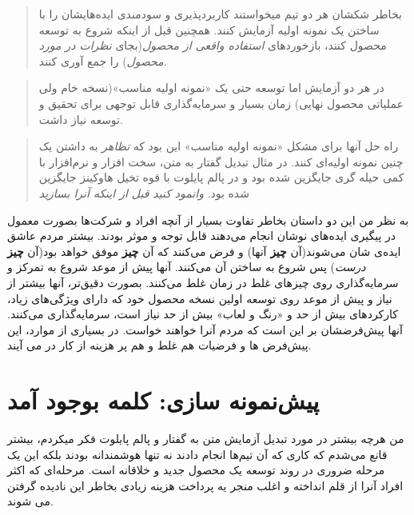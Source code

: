 \begin{quote}
بخاطر شکشان هر دو تیم میخواستند کاربردپذیری و سودمندی ایده‌هایشان را با
ساختن یک نمونه اولیه آزمایش کنند. همچنین قبل از اینکه شروع به توسعه
محصول کنند، بازخوردهای \emph{استفاده واقعی از محصول}(بجای \emph{نظرات در
مورد محصول}) را جمع آوری کنند.
\end{quote}

\begin{quote}
در هر دو آزمایش اما توسعه حتی یک «نمونه اولیه مناسب»(نسخه خام ولی
عملیاتی محصول نهایی) زمان بسیار و سرمایه‌گذاری قابل توجهی برای تحقیق و
توسعه نیاز داشت.
\end{quote}

\begin{quote}
راه حل آنها برای مشکل «نمونه اولیه مناسب» این بود که \emph{تظاهر} به
داشتن یک چنین نمونه اولیه‌ای کنند. در مثال تبدیل گفتار به متن، سخت افزار
و نرم‌افزار با کمی حیله گری جایگزین شده بود و در پالم پایلوت با قوه تخیل
هاوکینز جایگزین شده بود. \emph{وانمود کنید قبل از اینکه آنرا بسازید}
\end{quote}

به نظر من این دو داستان بخاطر تفاوت بسیار از آنچه افراد و شرکت‌ها بصورت
معمول در پیگیری ایده‌های نوشان انجام می‌دهند قابل توجه و موثر بودند.
بیشتر مردم عاشق ایده‌ی شان می‌شوند(آن \textbf{چیز} آنها) و فرض می‌کنند
که آن \textbf{چیز} موفق خواهد بود(آن \textbf{چیز} \emph{درست}) پس شروع
به ساختن آن می‌کنند. آنها پیش از موعد شروع به تمرکز و سرمایه‌گذاری روی
چیزهای غلط در زمان غلط می‌کنند. بصورت دقیق‌تر، آنها بیشتر از نیاز و پیش
از موعد روی توسعه اولین نسخه محصول خود که دارای ویژگی‌های زیاد،
کارکردهای بیش از حد و «رنگ و لعاب» بیش از حد نیاز است، سرمایه‌گذاری
می‌کنند. آنها پیش‌فرضشان بر این است که مردم آنرا خواهند خواست. در بسیاری
از موارد، این پیش‌فرض ها و فرضیات هم غلط و هم پر هزینه از کار در می
آیند.

\section{پیش‌نمونه سازی: کلمه بوجود
آمد}\label{ux67eux6ccux634ux646ux645ux648ux646ux647-ux633ux627ux632ux6cc-ux6a9ux644ux645ux647-ux628ux648ux62cux648ux62f-ux622ux645ux62f}

من هرچه بیشتر در مورد تبدیل آزمایش متن به گفتار و پالم پایلوت فکر
میکردم، بیشتر قانع می‌شدم که کاری که آن تیم‌ها انجام دادند نه تنها
هوشمندانه بودند بلکه این یک مرحله ضروری در روند توسعه یک محصول جدید و
خلاقانه است. مرحله‌ای که اکثر افراد آنرا از قلم انداخته و اغلب منجر یه
پرداخت هزینه زیادی بخاطر این نادیده گرفتن می شوند.


